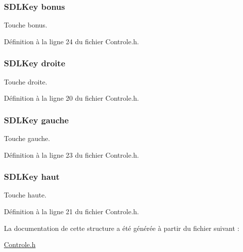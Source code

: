 \hypertarget{struct_controle_aee145d374ea504506aac885e3f52fd1a}{
\subsubsection[{bonus}]{\setlength{\rightskip}{0pt plus 5cm}S\-D\-L\-Key bonus}}\label{struct_controle_aee145d374ea504506aac885e3f52fd1a}
Touche bonus. 

Définition à la ligne 24 du fichier Controle.\-h.

\hypertarget{struct_controle_a8c858ff7fc954b8745846564f369c17b}{
\subsubsection[{droite}]{\setlength{\rightskip}{0pt plus 5cm}S\-D\-L\-Key droite}}\label{struct_controle_a8c858ff7fc954b8745846564f369c17b}
Touche droite. 

Définition à la ligne 20 du fichier Controle.\-h.

\hypertarget{struct_controle_a98fff2252bb332ebd2dbb829aaae5315}{
\subsubsection[{gauche}]{\setlength{\rightskip}{0pt plus 5cm}S\-D\-L\-Key gauche}}\label{struct_controle_a98fff2252bb332ebd2dbb829aaae5315}
Touche gauche. 

Définition à la ligne 23 du fichier Controle.\-h.

\hypertarget{struct_controle_a10afd751fc145f40ed86fe3c43c0e2e7}{
\subsubsection[{haut}]{\setlength{\rightskip}{0pt plus 5cm}S\-D\-L\-Key haut}}\label{struct_controle_a10afd751fc145f40ed86fe3c43c0e2e7}
Touche haute. 

Définition à la ligne 21 du fichier Controle.\-h.



La documentation de cette structure a été générée à partir du fichier suivant \-:\begin{DoxyCompactItemize}
\item 
\hyperlink{_controle_8h}{Controle.\-h}\end{DoxyCompactItemize}
